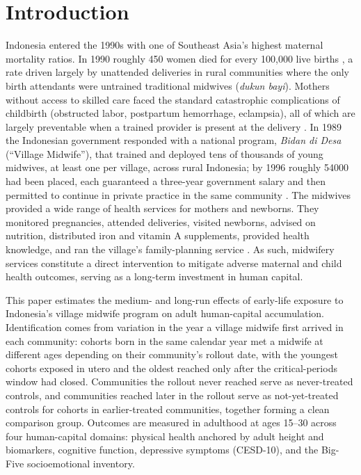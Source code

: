 
\section{Introduction} \label{sec:intro}

Indonesia entered the 1990s with one of Southeast Asia's highest maternal mortality ratios. In 1990 roughly 450 women died for every 100{,}000 live births \autocite{unicef}, a rate driven largely by unattended deliveries in rural communities where the only birth attendants were untrained traditional midwives (\emph{dukun bayi}). Mothers without access to skilled care faced the standard catastrophic complications of childbirth (obstructed labor, postpartum hemorrhage, eclampsia), all of which are largely preventable when a trained provider is present at the delivery \autocite{geefhuysen1999,makowiecka2008}. In 1989 the Indonesian government responded with a national program, \emph{Bidan di Desa} (``Village Midwife''), that trained and deployed tens of thousands of young midwives, at least one per village, across rural Indonesia; by 1996 roughly \num{54000} had been placed, each guaranteed a three-year government salary and then permitted to continue in private practice in the same community \autocite{gani1996}. The midwives provided a wide range of health services for mothers and newborns. They monitored pregnancies, attended deliveries, visited newborns, advised on nutrition, distributed iron and vitamin A supplements, provided health knowledge, and ran the village's family-planning service \autocite{frankenberg2005,makowiecka2008}. As such, midwifery services constitute a direct intervention to mitigate adverse maternal and child health outcomes, serving as a long-term investment in human capital. 

This paper estimates the medium- and long-run effects of early-life exposure to Indonesia's village midwife program on adult human-capital accumulation. Identification comes from variation in the year a village midwife first arrived in each community: cohorts born in the same calendar year met a midwife at different ages depending on their community's rollout date, with the youngest cohorts exposed in utero and the oldest reached only after the critical-periods window had closed. Communities the rollout never reached serve as never-treated controls, and communities reached later in the rollout serve as not-yet-treated controls for cohorts in earlier-treated communities, together forming a clean comparison group. Outcomes are measured in adulthood at ages 15--30 across four human-capital domains: physical health anchored by adult height and biomarkers, cognitive function, depressive symptoms (CESD-10), and the Big-Five socioemotional inventory.

